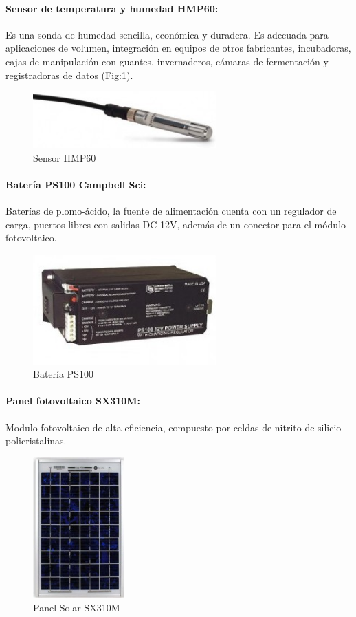 \newpage
\paragraph{Sensor de temperatura y humedad HMP60:}
Es una sonda de humedad sencilla, económica y duradera. Es adecuada para aplicaciones de volumen, integración en equipos de otros fabricantes, incubadoras, cajas de manipulación con guantes, invernaderos, cámaras de fermentación y registradoras de datos (Fig:\ref{hr}).

\begin{figure}[h!]
        \centering
        \includegraphics[width=200pt]{images/SensorThmp60}
        \caption{Sensor HMP60}
	\label{hr}
\end{figure}

\paragraph{Batería PS100 Campbell Sci:}
Baterías de plomo-ácido, la fuente de alimentación cuenta con un regulador de carga, puertos libres con salidas DC 12V, además de un conector para el módulo fotovoltaico.

\begin{figure}[h!]
        \centering
        \includegraphics[width=200pt]{images/bateria}
        \caption{Batería PS100} 
\end{figure}

\paragraph{Panel fotovoltaico SX310M:}
Modulo fotovoltaico de alta eficiencia, compuesto por celdas de nitrito de silicio policristalinas.

\begin{figure}[h!]
        \centering
        \includegraphics[width=100pt]{images/panelSolar}
        \caption{Panel Solar SX310M} 
\end{figure}

